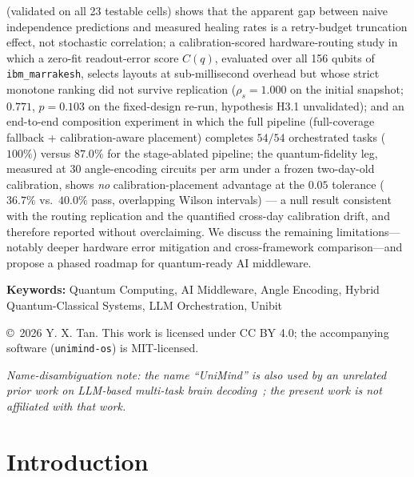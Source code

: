 ﻿\documentclass[12pt,a4paper]{article}
\begin{document}
\begin{titlepage}
\begin{minipage}{0.92\textwidth}
(validated on all 23 testable cells) shows that the apparent gap between naive independence predictions and measured healing rates is a retry-budget truncation effect, not stochastic correlation; a calibration-scored hardware-routing study in which a zero-fit readout-error score $C(q)$, evaluated over all 156 qubits of \texttt{ibm\_marrakesh}, selects layouts at sub-millisecond overhead but whose strict monotone ranking did not survive replication ($\rho_s = 1.000$ on the initial snapshot; $0.771$, $p = 0.103$ on the fixed-design re-run, hypothesis H3.1 unvalidated); and an end-to-end composition experiment in which the full pipeline (full-coverage fallback + calibration-aware placement) completes $54/54$ orchestrated tasks ($100\%$) versus $87.0\%$ for the stage-ablated pipeline; the quantum-fidelity leg, measured at 30 angle-encoding circuits per arm under a frozen two-day-old calibration, shows \emph{no} calibration-placement advantage at the $0.05$ tolerance ($36.7\%$ vs.\ $40.0\%$ pass, overlapping Wilson intervals) --- a null result consistent with the routing replication and the quantified cross-day calibration drift, and therefore reported without overclaiming. We discuss the remaining limitations---notably deeper hardware error mitigation and cross-framework comparison---and propose a phased roadmap for quantum-ready AI middleware.
\end{minipage}

\vspace{0.8cm}

\noindent\textbf{Keywords:} Quantum Computing, AI Middleware, Angle Encoding, Hybrid Quantum-Classical Systems, LLM Orchestration, Unibit

\vfill

{\small\copyright\ 2026 Y. X. Tan. This work is licensed under CC BY 4.0; the accompanying software (\texttt{unimind-os}) is MIT-licensed.}

\vspace{0.4cm}

{\small\itshape Name-disambiguation note: the name ``UniMind'' is also used by an unrelated prior work on LLM-based multi-task brain decoding~\cite{lu2025unimind}; the present work is not affiliated with that work.\par}

\end{titlepage}

\tableofcontents
\newpage

\section{Introduction}
\end{document}
